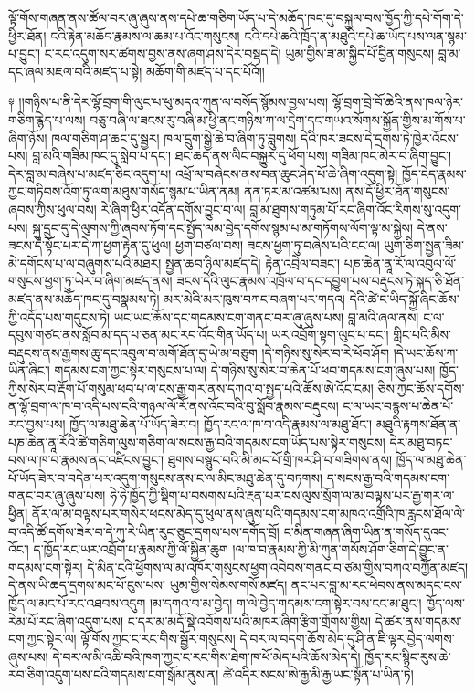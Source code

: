 \documentclass{article}
\begin{document}
ལྟོ་གོས་གཞན་ནས་ཚོལ་བར་ཞུ་ཞུས་ནས་དཔེ་ཆ་གཅིག་ཡོད་པ་དེ་མཆོད་ཁང་དུ་བསྐྱལ་བས་ཁྱོད་ཀྱི་དཔེ་གོག་དེ་ཕྱིར་ཐོན། ངའི་རྟེན་མཆོད་རྣམས་ལ་ཆམ་པ་འོང་གསུངས། ངའི་དཔེ་ཆའི་ཁྲོད་ན་མཐུའི་དཔེ་ཆ་ཡོད་པས་ལན་སྙམ་པ་བྱུང་། ང་རང་འདུག་སར་ཚགས་བྱས་ནས་ཞག་ཤས་དེར་བསྡད་དེ། ཡུམ་གྱིས་ཟ་མ་སྐྱིད་པོ་བྱིན་གསུངས། བླ་མ་དང་ཞལ་མཇལ་བའི་མཛད་པ་སྟེ། མཆོག་གི་མཛད་པ་དང་པོའོ།།

༈ །།གཉིས་པ་ནི་དེར་ལྷོ་བྲག་གི་ལུང་པ་ཕུ་མདའ་ཀུན་ལ་བསོད་སྙོམས་བྱས་པས། ལྷོ་བྲག་བྲེ་བོ་ཆེའི་ནས་ཁལ་ཉེར་གཅིག་རྙེད་པ་ལས། བཅུ་བཞི་ལ་ཟངས་རུ་བཞི་མ་ཕྱི་ནང་གཉིས་ཀ་ལ་དྲེག་དང་གཡའ་སོགས་སྐྱོན་གྱིས་མ་གོས་པ་ཞིག་ཉོས། ཁལ་གཅིག་ཤ་ཆང་དུ་སྦྱར། ཁལ་དྲུག་སྒྱེ་ཆེ་བ་ཞིག་ཏུ་བླུགས། དེའི་ཁར་ཟངས་དེ་དྲགས་ཏེ་ཁྱེར་འོངས་པས། བླ་མའི་གཟིམ་ཁང་དུ་སླེབ་པ་དང་། ཐང་ཆད་ནས་ལིང་བསྐྱུར་དུ་ཕོག་པས། གཟིམ་ཁང་མེར་བ་ཞིག་བྱུང་། དེར་བླ་མ་བཞེས་པ་མཛད་ཅིང་འདུག་པ། འཕྲོ་ལ་བཞེངས་ནས་བན་ཆུང་ཤེད་པོ་ཆེ་ཞིག་འདུག་སྟེ། ཁྱོད་ངེད་རྣམས་ཀྱང་གཏིབས་འོག་ཏུ་ལག་མཐུས་གསོད་སྙམ་པ་ཡིན་ནམ། ནན་ཏར་མ་འཚམ་པས། ནས་དོ་ཕྱིར་ཐོན་གསུངས་ཞབས་ཀྱིས་ཕུལ་བས། རེ་ཞིག་ཕྱིར་འདོན་དགོས་བྱུང་བ་ལ། བླ་མ་ཐུགས་གཏུམ་པོ་རང་ཞིག་འོང་རིགས་སུ་འདུག་པས། སྐུ་དྲུང་དུ་དེ་ལུགས་ཀྱི་ཞབས་ཏོག་དང་སྤྱོད་ལམ་བྱེད་དགོས་སྙམ་པ་མ་གཏོགས་ལོག་ལྟ་མ་སྐྱེས། དེ་ནས་ཟངས་དེ་སྟོང་པར་དེ་ཀ་ཕྱག་རྟེན་དུ་ཕུལ། ཕྱག་བཙལ་བས། ཟངས་ཕྱག་ཏུ་བཞེས་པའི་ངང་ལ། ཡུག་ཅིག་སྤྱན་ཟིམ་མེ་དགོངས་པ་ལ་བཞུགས་པའི་མཐར། སྤྱན་ཆབ་ཉིལ་མཛད་དེ། རྟེན་འབྲེལ་བཟང་། པཎ་ཆེན་ནཱ་རོ་ལ་འབུལ་ལོ་གསུངས་ཕྱག་ཏུ་ཡེར་བ་ཞིག་མཛད་ནས། ཟངས་དེའི་ལུང་རྣམས་འཁྲོལ་བ་དང་དབྱུག་པས་བརྡུངས་ཏེ་སྐད་ཅི་ཐོན་མཛད་ནས་མཆོད་ཁང་དུ་བསྣམས་ཏེ། མར་མེའི་མར་ཁུས་བཀང་བཞག་པར་གདའ། དེའི་ཚེ་ང་ཡིད་སྐྱོ་ཞིང་ཆོས་ཀྱི་འདོད་པས་གདུངས་ཏེ། ཡང་ཡང་ཆོས་དང་གདམས་ངག་གནང་བར་ཞུ་ཞུས་པས། བླ་མའི་ཞལ་ནས། ང་ལ་དབུས་གཙང་ནས་སློབ་མ་དད་པ་ཅན་མང་རབ་འོང་གིན་ཡོད་པ། ཡར་འབྲོག་སྟག་ལུང་པ་དང་། གླིང་པའི་མིས་བརྡུངས་ནས་རྒྱགས་ཆུ་དང་འབུལ་བ་མགོ་ཐོན་དུ་ཡེ་མ་བཅུག །དེ་གཉིས་སུ་སེར་བ་རེ་ཕོབ་ཤོག །དེ་ཡང་ཆོས་ཀ་ཡིན་ཞིང་། གདམས་ངག་ཀྱང་སྟེར་གསུངས་པ་ལ། དེ་གཉིས་སུ་སེར་བ་ཆེན་པོ་ཕབ་གདམས་ངག་ཞུས་པས། ཁྱོད་ཀྱིས་སེར་བ་རྡོག་པོ་གསུམ་ཕབ་པ་ལ་ངས་རྒྱ་གར་ནས་དཀའ་བ་སྤྱད་པའི་ཆོས་ཨེ་འོང་ངམ། ཅིས་ཀྱང་ཆོས་དགོས་ན་ལྷོ་བྲག་ལ་ཁ་བ་འདི་པས་ངའི་གཉལ་ལོ་རོ་ནས་འོང་བའི་བུ་སློབ་རྣམས་བརྡུངས། ང་ལ་ཡང་བརྙས་པ་ཆེན་པོ་རང་བྱས་པས། ཁྱོད་ལ་མཐུ་ཆེན་པོ་ཡོད་ཟེར་བ། ཁྱོད་རང་ལ་ཁ་བ་འདི་རྣམས་ལ་མཐུ་ཐོང་། མཐུའི་རྟགས་ཐོན་ན་པཎ་ཆེན་ནཱ་རོའི་ཚེ་གཅིག་ལུས་གཅིག་ལ་སངས་རྒྱ་བའི་གདམས་ངག་ཡོད་པས་སྟེར་གསུངས། དེར་མཐུ་བཏང་བས་ལ་ཁ་བ་རྣམས་ནང་འཛིངས་བྱུང་། ཐུགས་བསྙུང་བའི་མི་མང་པོ་གྲི་ཁར་ཤི་བ་གཟིགས་ནས། ཁྱོད་ལ་མཐུ་ཆེན་པོ་ཡོད་ཟེར་བ་བདེན་པར་འདུག་གསུངས་ནས་ང་ལ་མིང་མཐུ་ཆེན་དུ་བཏགས། ད་སངས་རྒྱ་བའི་གདམས་ངག་གནང་བར་ཞུ་ཞུས་པས། ཧེ་ཧེ་ཁྱོད་ཀྱི་སྡིག་པ་བསགས་པའི་རྔན་པར་ངས་ལུས་སྲོག་ལ་མ་བལྟས་པར་རྒྱ་གར་ལ་ཕྱིན། ནོར་ལ་མ་བལྟས་པར་གསེར་ཕངས་མེད་དུ་ཕུལ་ནས་ཞུས་པའི་གདམས་ངག་མཁའ་འགྲོའི་ཁ་རླངས་ཐོལ་ལེ་བ་འདི་ཚོ་དགོས་ཟེར་བ་དེ་ཀུ་རེ་ཡིན་རུང་ཅུང་དྲགས་པས་དགོད་བྲོ། ང་མིན་གཞན་ཞིག་ཡིན་ན་གསོད་དུའང་འོང་། ད་ཁྱོད་རང་ཡར་འབྲོག་པ་རྣམས་ཀྱི་ལོ་སྐྱིན་ཆུག །ལ་ཁ་བ་རྣམས་ཀྱི་མི་ཀུན་གསོས་ཤོག་ཅིག་དེ་བྱུང་ན་གདམས་ངག་སྟེར། དེ་མིན་ངའི་ཕྱོགས་ལ་མ་འཁོར་གསུངས་ཕྱག་འབེབས་གནང་བ་ཙམ་གྱིས་བཀའ་བཀྱོན་མཛད། དེ་ནས་ཡི་ཆད་དྲགས་མང་པོ་ངུས་པས། ཡུམ་གྱིས་སེམས་གསོ་མཛད། ནང་པར་བླ་མ་རང་ཕེབས་ནས་མདང་ངས་ཁྱོད་ལ་མང་པོ་རང་འཐབས་འདུག །མ་དགའ་བ་མ་བྱེད། ག་ལེ་བྱེད་གདམས་ངག་སྟེར་བས་ངང་མ་ཐུང་། ཁྱོད་ལས་རེམ་པོ་རང་ཞིག་འདུག་པས། ང་དར་མ་མདོ་སྡེ་འབོགས་པའི་མཁར་ཞིག་རྩིག་གྲོགས་གྱིས། དེ་ཚར་ནས་གདམས་ངག་ཀྱང་སྟེར་ལ། ལྟོ་གོས་ཀྱང་ང་རང་གིས་སྦྱོར་གསུངས། དེ་བར་ལ་བདག་ཆོས་མེད་དུ་ཤི་ན་ཇི་ལྟར་བྱེད་ལགས་ཞུས་པས། དེ་བར་ལ་མི་འཆི་བའི་ཁག་ཀྱང་ང་རང་གིས་ཐེག་ཁ་ཕོ་མེད་པའི་ཆོས་མེད་དེ། ཁྱོད་རང་སྙིང་རུས་ཆེ་རབ་ཅིག་འདུག་པས་ངའི་གདམས་ངག་སྒོམ་ནུས་ན། ཚེ་འདིར་སངས་ཨེ་རྒྱ་མི་རྒྱ་ཡང་སྟོན་པ་ཡིན་ཏེ། 
\end{document}
